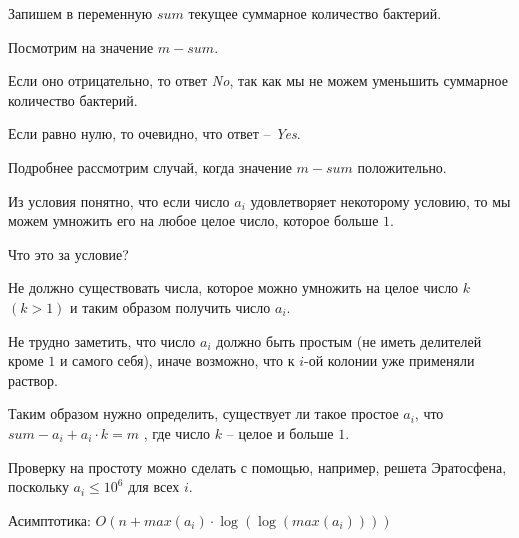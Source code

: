 \solutionSection

Запишем в переменную $sum$ текущее суммарное количество бактерий.

Посмотрим на значение $m - sum$.

Если оно отрицательно, то ответ \textit{No}, так как мы не можем уменьшить
суммарное количество бактерий.

Если равно нулю, то очевидно, что ответ – \textit{Yes}.

Подробнее рассмотрим случай, когда значение $m - sum$ положительно.

Из условия понятно, что если число $a_i$ удовлетворяет некоторому условию,
то мы можем умножить его на любое целое число, которое больше $1$.

Что это за условие?

Не должно существовать числа, которое можно умножить на целое число $k$
$(k > 1)$ и таким образом получить число $a_i$.

Не трудно заметить, что число $a_i$ должно быть простым
(не иметь делителей кроме $1$ и самого себя),
иначе возможно, что к $i$-ой колонии уже применяли раствор.

Таким образом нужно определить, существует ли такое простое $a_i$, что
$sum - a_i + a_i \cdot k = m$ , где число $k$ – целое и больше $1$.

Проверку на простоту можно сделать с помощью, например, решета Эратосфена,
поскольку $a_i \le 10^6$ для всех $i$.

Асимптотика: $O(n + max(a_i) \cdot \log (\log (max(a_i))))$

\codeExample

